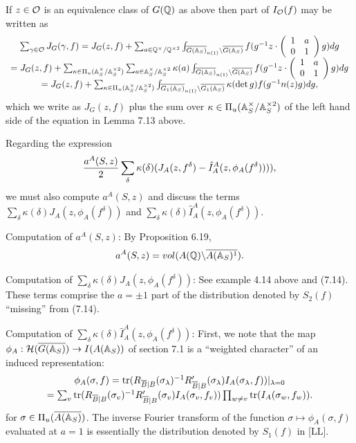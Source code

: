 If $z\in {\cal{O}}$ is an equivalence class of $G(\mathbb{Q} )$
as above then part of $I_{\cal{O}}(f)$ may be written as
\begin{equation}
\begin{array}{c}
\sum_{\gamma\in {\cal{O}}} J_G(\gamma,f)
=J_G(z,f)+\sum_{a\in \mathbb{Q} ^{\times}/\mathbb{Q} ^{\times 2}}
\int_{\overline{G(\mathbb{A} _S)}_{n(1)}
\backslash \overline{G(\mathbb{A} _S)}} f(g^{-1} z\cdot
\left(
\begin{array}{cc}
1 & a\\
0 & 1
\end{array}
\right)
g)dg\\
=J_G(z,f)+
\sum_{\kappa \in \Pi_u(\mathbb{A} _S^{\times}/\mathbb{A} _S^{\times 2})}
\sum_{a \in \mathbb{A} _S^{\times}/\mathbb{A} _S^{\times 2}}
\kappa (a)
\int_{\overline{G(\mathbb{A} _S)}_{n(1)}
\backslash \overline{G(\mathbb{A} _S)}} f(g^{-1} z\cdot
\left(
\begin{array}{cc}
1 & a\\
0 & 1
\end{array}
\right)
g)dg\\
=J_G(z,f)+
\sum_{\kappa \in \Pi_u(\mathbb{A} _S^{\times}/\mathbb{A} _S^{\times 2})}
\int_{\overline{G_1(\mathbb{A} _S)}_{n(1)}
\backslash \overline{G_1(\mathbb{A} _S)}} \kappa(\det{g})
f(g^{-1} n(z) g)dg,
\end{array}
\end{equation}
which we write as $J_G(z,f)$ plus the sum over
$\kappa \in \Pi_u(\mathbb{A} _S^{\times}/\mathbb{A} _S^{\times 2})$
of the left hand side of the equation in Lemma 7.13 above.

Regarding the expression
\[
{a^A(S,z)\over 2}
\sum_\delta \kappa(\delta)
(J_A(z,f^\delta)-\hat{I}_A^A(z,\phi_A(f^\delta)))),
\]
we must also compute $a^A(S,z)$ and discuss the terms
$\sum_\delta \kappa(\delta)J_A(z,\phi_A(f^\delta))$ and
$\sum_\delta \kappa(\delta)\hat{I}_A^A(z,\phi_A(f^\delta))$.

Computation of $a^A(S,z)$: By Proposition 6.19,
\[
a^A(S,z)=vol(A(\mathbb{Q} )\backslash \overline{A(\mathbb{A} _S)^1}).
\]

Computation of
$\sum_\delta \kappa(\delta)J_A(z,\phi_A(f^\delta))$:
See example 4.14 above and (7.14). These terms
comprise the $a=\pm 1$ part of the distribution denoted by
$S_2(f)$ ``missing'' from (7.14).

Computation of $\sum_\delta \kappa(\delta)\hat{I}_A^A(z,\phi_A(f^\delta))$:
First, we note that the map
$\phi_A:{\cal{H}}(\overline{G(\mathbb{A} _S)}) \rightarrow I(A(\mathbb{A} _S))$
of section 7.1 is a ``weighted
character'' of an induced representation:
\begin{equation}
\begin{array}{c}
\phi_A(\sigma,f)=
{\rm tr}(R_{\overline{B}|B}(\sigma_\lambda)^{-1}
R'_{\overline{B}|B}(\sigma_\lambda)I_A(\sigma_\lambda,f))|_{\lambda =0}\\
=\sum_v
{\rm tr}(R_{\overline{B}|B}(\sigma_v)^{-1}
R'_{\overline{B}|B}(\sigma_v)I_A(\sigma_v,f_v))
\prod_{w\not= v}{\rm tr}(I_A(\sigma_w,f_w)).
\end{array}
\end{equation}
for $\sigma\in \Pi_u(\overline{A(\mathbb{A} _S)})$.
The inverse Fourier transform of the function
$\sigma\longmapsto \phi_A(\sigma, f)$ evaluated at $a=1$ is
essentially the distribution denoted by $S_1(f)$ in [LL].

